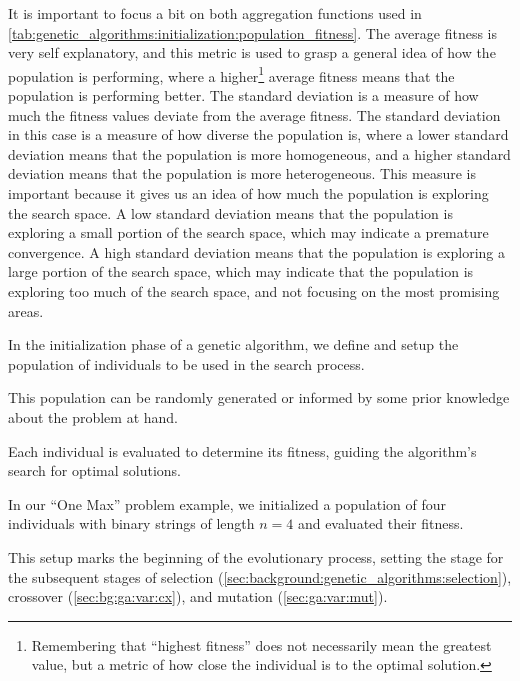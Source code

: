   It is important to focus a bit on both aggregation functions used in
  \vref{tab:genetic_algorithms:initialization:population_fitness}.
  The average fitness is very self explanatory, and this metric is used to
  grasp a general idea of how the population is performing, where a 
  higher\footnote{
    Remembering that \enquote{highest fitness} does not necessarily mean the 
    greatest value, but a metric of how close the individual is to the optimal 
    solution.
  } average fitness means that the population is performing better.
  The standard deviation is a measure of how much the fitness values deviate
  from the average fitness.
  The standard deviation in this case is a measure of how diverse the
  population is, where a lower standard deviation means that the population is
  more homogeneous, and a higher standard deviation means that the population
  is more heterogeneous.
  This measure is important because it gives us an idea of how much the
  population is exploring the search space.
  A low standard deviation means that the population is exploring a small
  portion of the search space, which may indicate a premature convergence.
  A high standard deviation means that the population is exploring a large
  portion of the search space, which may indicate that the population is
  exploring too much of the search space, and not focusing on the most
  promising areas.

  In the initialization phase of a genetic algorithm, we define and setup the 
  population of individuals to be used in the search process.

  This population can be randomly generated or informed by some prior knowledge 
  about the problem at hand.

  Each individual is evaluated to determine its fitness, guiding the 
  algorithm's search for optimal solutions.

  In our \enquote{One Max} problem example, we initialized a population of four 
  individuals with binary strings of length \(n = 4\) and evaluated their 
  fitness.

  This setup marks the beginning of the evolutionary process, setting the stage 
  for the subsequent stages of selection 
  (\vref{sec:background:genetic_algorithms:selection}), crossover 
  (\vref{sec:bg:ga:var:cx}), and mutation (\vref{sec:ga:var:mut}).
